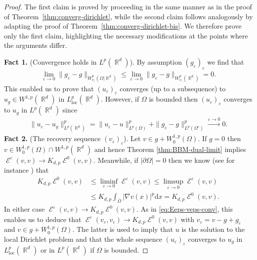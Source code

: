 \documentclass[12pt, reqno]{amsart}%
\theoremstyle{plain}  %
\theoremstyle{definition}  %
\numberwithin{equation}{section}
\DeclareMathOperator{\loc}{loc}
\DeclareMathOperator{\cE}{\mathcal{E}}
\DeclareMathOperator{\R}{\mathbb{R}}
\renewcommand{\d}{\mathrm{d}}
\newcommand{\eps}{\varepsilon}
\begin{document}
\begin{proof}
The first claim is proved by proceeding in the same manner as in the proof of Theorem~\ref{thm:converg-dirichlet}, while the second claim follows analogously by adapting the proof of Theorem~\ref{thm:converg-dirichlet-bis}. We therefore prove only the first claim, highlighting the necessary modifications at the points where the arguments differ.

\smallskip

\textbf{Fact 1.} (Convergence holds in $L^p(\R^d)$).  By assumption $(g_\eps)_\eps$ we find that
\begin{align*}
\lim_{\eps\to0}	\|g_\eps-g\|_{W^p_{\nu_\eps}(\Omega|\R^d)}
\leq  \lim_{\eps\to0}	\|g_\eps-g\|_{W^p_{\nu_\eps}(\R^d)}=0.
\end{align*}
This enabled us  to prove that $(u_\eps)_\eps$ converges (up to a subsequence) to $u_g\in W^{1,p}(\R^d)$  in $ L^p_{\loc}(\R^d)$. However, if $\Omega$ is bounded then $(u_\eps)_\eps$ converges to $u_g$ in $L^p(\R^d)$ since
\begin{align}\label{eq:xxconver-ueps-Lp}
\| u_\eps-u_g\|^p_{L^p(\R^d)}= \| u_\eps-u\|^p_{L^p(\Omega)}+ \| g_\eps-g\|^p_{L^p(\Omega^c)}\xrightarrow{\eps\to0}0.
\end{align}
\textbf{Fact 2.} (The recovery sequence $(v_\eps)_\eps$).  Let $v\in g+W^{1,p}_0(\Omega)$.  If $g=0$ then $v\in W^{1,p}_0(\Omega)\cap W^{1,p}(\R^d)$ and hence Theorem \ref{thm:BBM-dual-limit} implies  $\cE^\eps(v,v)\to K_{d,p}\cE^0(v,v)$. Meanwhile, if $|\partial\Omega|=0$ then we know (see  for instance  \cite{Fog23}) that
\begin{align*}
K_{d,p}\cE^0(v,v)&\leq \liminf_{\eps\to0}\cE^\eps(v,v)\leq
\limsup_{\eps\to0}\cE^\eps(v,v)\\
&\leq K_{d,p}\int_{ \overline{\Omega}}|\nabla v(x)|^p\d x = K_{d,p}\cE^0(v,v).
\end{align*}
In either case $\cE^\eps(v,v)\to K_{d,p}\cE^0(v,v)$. As in \eqref{eq:Eeps-veps-conv}, this enables us to deduce that $\cE^\eps(v_\eps,v_\eps)\to K_{d,p}\cE^0(v,v)$ with $v_\eps = v-g+g_\eps$ and $v\in g+W^{1,p}_0(\Omega)$. The latter is used to imply that $u$ is the solution to the local Dirichlet problem and that the whole sequence $(u_\eps)_\eps$ converges to $u_g$ in $L^p_{\loc}(\R^d)$ or in $L^p(\R^d)$ if $\Omega$ is bounded.

\smallskip


\end{proof}
\end{document}
